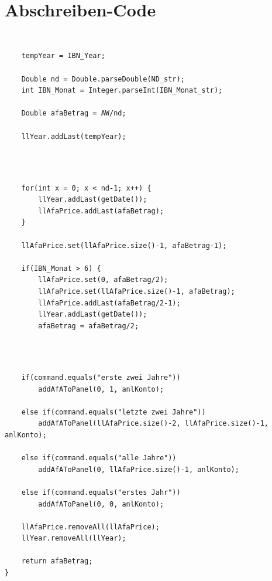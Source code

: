 \documentclass[12pt]{report}
\begin{document}
\newpage

\section{Abschreiben-Code}
\subsection{}

\begin{lstlisting}
		
	tempYear = IBN_Year;
		
	Double nd = Double.parseDouble(ND_str);
	int IBN_Monat = Integer.parseInt(IBN_Monat_str);
	
	Double afaBetrag = AW/nd;
	
	llYear.addLast(tempYear);
	
\end{lstlisting}

\subsection{}

\begin{lstlisting}
					
	for(int x = 0; x < nd-1; x++) {
		llYear.addLast(getDate());
		llAfaPrice.addLast(afaBetrag);
	}
	
	llAfaPrice.set(llAfaPrice.size()-1, afaBetrag-1);
	
	if(IBN_Monat > 6) {
		llAfaPrice.set(0, afaBetrag/2);
		llAfaPrice.set(llAfaPrice.size()-1, afaBetrag);
		llAfaPrice.addLast(afaBetrag/2-1);
		llYear.addLast(getDate());
		afaBetrag = afaBetrag/2;
		
\end{lstlisting}

\subsection{}

\begin{lstlisting}
		
	if(command.equals("erste zwei Jahre"))
	    addAfAToPanel(0, 1, anlKonto);
	
	else if(command.equals("letzte zwei Jahre"))
	    addAfAToPanel(llAfaPrice.size()-2, llAfaPrice.size()-1, anlKonto);
	
	else if(command.equals("alle Jahre"))
	    addAfAToPanel(0, llAfaPrice.size()-1, anlKonto);
	
	else if(command.equals("erstes Jahr"))
	    addAfAToPanel(0, 0, anlKonto);
	
	llAfaPrice.removeAll(llAfaPrice);
	llYear.removeAll(llYear);
	
	return afaBetrag;
}
\end{lstlisting}
\end{document}
